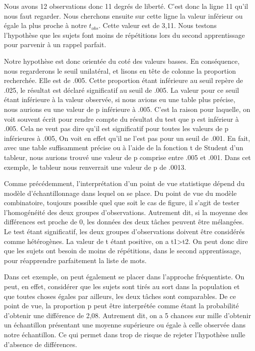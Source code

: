 \documentclass[]{book}
\theoremstyle{definition}
\theoremstyle{definition}
\theoremstyle{definition}
\theoremstyle{remark}
\begin{document}
Nous avons 12 observations donc 11 degrés de liberté. C'est donc la
ligne 11 qu'il nous faut regarder. Nous cherchons ensuite sur cette
ligne la valeur inférieur ou égale la plus proche à notre \(t_{obs}\).
Cette valeur est de 3,11. Nous testons l'hypothèse que les sujets font
moins de répétitions lors du second apprentissage pour parvenir à un
rappel parfait.

Notre hypothèse est donc orientée du coté des valeurs basses. En
conséquence, nous regarderons le seuil unilatéral, et lisons en tête de
colonne la proportion recherchée. Elle est de .005. Cette proportion
étant inférieure au seuil repère de .025, le résultat est déclaré
significatif au seuil de .005. La valeur pour ce seuil étant inférieure
à la valeur observée, si nous avions eu une table plus précise, nous
aurions eu une valeur de p inférieure à .005. C'est la raison pour
laquelle, on voit souvent écrit pour rendre compte du résultat du test
que p est inférieur à .005. Cela ne veut pas dire qu'il est significatif
pour toutes les valeurs de p inférieures à .005, On voit en effet qu'il
ne l'est pas pour un seuil de .001. En fait, avec une table suffisamment
précise ou à l'aide de la fonction t de Student d'un tableur, nous
aurions trouvé une valeur de p comprise entre .005 et .001. Dans cet
exemple, le tableur nous renverrait une valeur de p de .0013.

Comme précédemment, l'interprétation d'un point de vue statistique
dépend du modèle d'échantillonnage dans lequel on se place. Du point de
vue du modèle combinatoire, toujours possible quel que soit le cas de
figure, il s'agit de tester l'homogénéité des deux groupes
d'observations. Autrement dit, si la moyenne des différences est proche
de 0, les données des deux tâches peuvent être mélangées. Le test étant
significatif, les deux groupes d'observations doivent être considérés
comme hétérogènes. La valeur de t étant positive, on a
t1\textgreater{}t2. On peut donc dire que les sujets ont besoin de moins
de répétitions, dans le second apprentissage, pour réapprendre
parfaitement la liste de mots.

Dans cet exemple, on peut également se placer dans l'approche
fréquentiste. On peut, en effet, considérer que les sujets sont tirés au
sort dans la population et que toutes choses égales par ailleurs, les
deux tâches sont comparables. De ce point de vue, la proportion p peut
être interprétée comme étant la probabilité d'obtenir une différence de
2,08. Autrement dit, on a 5 chances sur mille d'obtenir un échantillon
présentant une moyenne supérieure ou égale à celle observée dans notre
échantillon. Ce qui permet dans trop de risque de rejeter l'hypothèse
nulle d'absence de différences.
\end{document}
